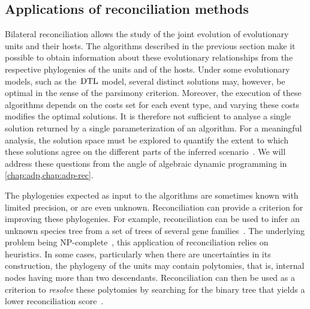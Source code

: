 \subsection{Applications of reconciliation methods}

Bilateral reconciliation allows the study of the joint evolution of evolutionary units and their hosts.
The algorithms described in the previous section make it possible to obtain information about these evolutionary relationships from the respective phylogenies of the units and of the hosts.
Under some evolutionary models, such as the~\(\mathrm{D}\mathrm{T}\mathrm{L}\) model, several distinct solutions may, however, be optimal in the sense of the parsimony criterion.
Moreover, the execution of these algorithms depends on the costs set for each event type, and varying these costs modifies the optimal solutions.
It is therefore not sufficient to analyse a single solution returned by a single parameterization of an algorithm.
For a meaningful analysis, the solution space must be explored to quantify the extent to which these solutions agree on the different parts of the inferred scenario~\parencite[see][]{Doyon2009SpaceGeneSpeciesTrees,Weiner2021ImprovedDuplicationTransfer}.
We will address these questions from the angle of algebraic dynamic programming in \cref{chap:adp,chap:adp-rec}.

The phylogenies expected as input to the algorithms are sometimes known with limited precision, or are even unknown.
Reconciliation can provide a criterion for improving these phylogenies.
For example, reconciliation can be used to infer an unknown species tree from a set of trees of several gene families~\parencite[see][p.~72--73]{Guigo1996ReconstructionAncientMolecular,Page1994MapsTreesCladistic}.
The underlying problem being NP-complete~\parencite{Ma2000GeneTreesSpecies}, this application of reconciliation relies on heuristics.
In some cases, particularly when there are uncertainties in its construction, the phylogeny of the units may contain polytomies, that is, internal nodes having more than two descendants.
Reconciliation can then be used as a criterion to \emph{resolve} these polytomies by searching for the binary tree that yields a lower reconciliation score~\parencite{Lafond2016EfficientNonBinary}.
